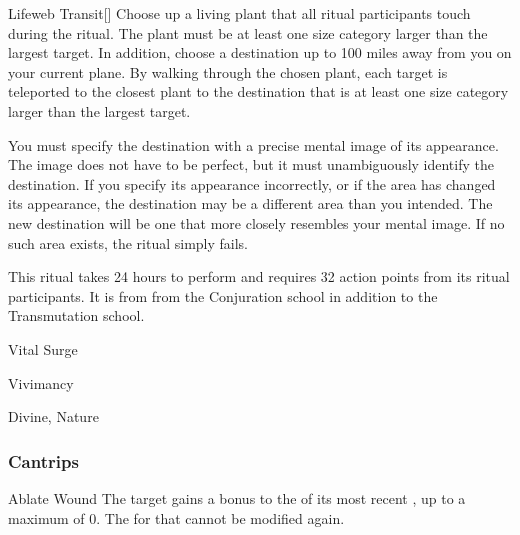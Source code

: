 \lowercase{\hypertarget{spell:Lifeweb Transit}{}}\label{spell:Lifeweb Transit}
\begin{apability}[\nth{4}]{\hypertarget{spell:Lifeweb Transit}{Lifeweb Transit}}[]
Choose up a living plant that all ritual participants touch during the ritual.
The plant must be at least one size category larger than the largest target.
In addition, choose a destination up to 100 miles away from you on your current plane.
By walking through the chosen plant, each target is teleported to the closest plant to the destination that is at least one size category larger than the largest target.

You must specify the destination with a precise mental image of its appearance.
The image does not have to be perfect, but it must unambiguously identify the destination.
If you specify its appearance incorrectly, or if the area has changed its appearance, the destination may be a different area than you intended.
The new destination will be one that more closely resembles your mental image.
If no such area exists, the ritual simply fails.

This ritual takes 24 hours to perform and requires 32 action points from its ritual participants.
It is from from the Conjuration school in addition to the Transmutation school.
\end{apability}
\vspace{0.25em}


\newpage
\begin{spellsection}{Vital Surge}

\begin{spellheader}
\end{spellheader}


 Vivimancy

 Divine, Nature

\subsubsection{Cantrips}


\begin{freeability}{Ablate Wound}
The target gains a  bonus to the  of its most recent , up to a maximum of 0.
The  for that  cannot be modified again.
\end{freeability}

\end{spellsection}


